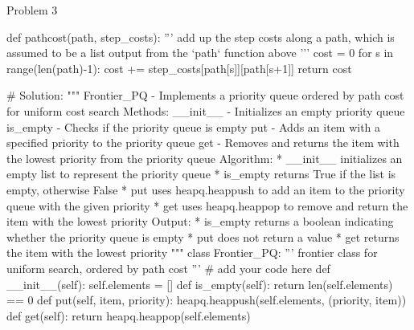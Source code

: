 \begin{problem}{Problem 3}
\begin{highlight}[Solution]
\begin{code}[Python]
    def pathcost(path, step_costs):
        '''
        add up the step costs along a path, which is assumed to be a list output from the `path` function above
        '''
        cost = 0
        for s in range(len(path)-1):
            cost += step_costs[path[s]][path[s+1]]
        return cost
    
    # Solution:
    """ Frontier_PQ - Implements a priority queue ordered by path cost for uniform cost search
        Methods:
            __init__ - Initializes an empty priority queue
            is_empty - Checks if the priority queue is empty
            put - Adds an item with a specified priority to the priority queue
            get - Removes and returns the item with the lowest priority from the priority queue
        Algorithm:
            * __init__ initializes an empty list to represent the priority queue
            * is_empty returns True if the list is empty, otherwise False
            * put uses heapq.heappush to add an item to the priority queue with the given priority
            * get uses heapq.heappop to remove and return the item with the lowest priority
        Output:
            * is_empty returns a boolean indicating whether the priority queue is empty
            * put does not return a value
            * get returns the item with the lowest priority
    """
    class Frontier_PQ:
        ''' frontier class for uniform search, ordered by path cost '''
        # add your code here
        def __init__(self):
            self.elements = []
        def is_empty(self):
            return len(self.elements) == 0
        def put(self, item, priority):
            heapq.heappush(self.elements, (priority, item))
        def get(self):
            return heapq.heappop(self.elements)
    

\end{code}
\end{highlight}
\end{problem}
